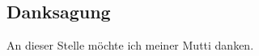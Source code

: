 \cleardoublepage
\begin{german}
\chapter*{Danksagung}
   An dieser Stelle möchte ich meiner Mutti danken.
\end{german}